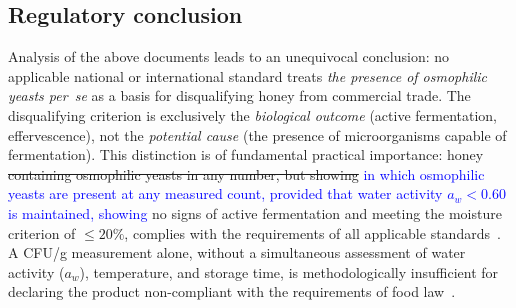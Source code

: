 \subsection{Regulatory conclusion}

Analysis of the above documents leads to an unequivocal conclusion:
no applicable national or international standard treats \emph{the
presence of osmophilic yeasts per~se} as a basis for disqualifying
honey from commercial trade. The disqualifying criterion is exclusively
the \emph{biological outcome} (active fermentation, effervescence),
not the \emph{potential cause} (the presence of microorganisms capable
of fermentation). This distinction is of fundamental practical
importance: honey \sout{containing osmophilic yeasts in any number, but showing}
\textcolor{blue}{in which osmophilic yeasts are present at any measured count,
provided that water activity $a_w < 0.60$ is maintained, showing}
no signs of active fermentation and meeting the moisture
criterion of $\leq 20\%$, complies with the requirements of all
applicable standards~\cite{codex_stan12,eudir2001110}.
A CFU/g measurement alone, without a simultaneous assessment of water
activity ($a_w$), temperature, and storage time, is methodologically
insufficient for declaring the product non-compliant with the
requirements of food law~\cite{tsagkaris2021,schoder2026}.
